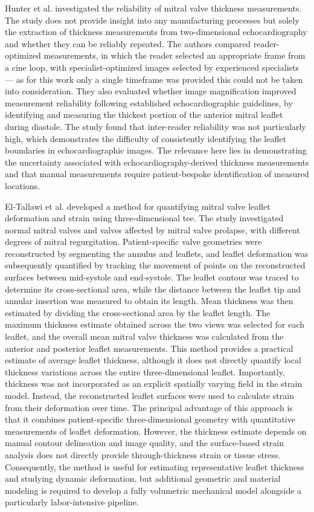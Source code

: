 Hunter et al. \cite{hunter2020screening} investigated the reliability of mitral valve thickness measurements. The study does not provide insight into any manufacturing processes but solely the extraction of thickness measurements from two-dimensional echocardiography and whether they can be reliably repeated. The authors compared reader-optimized measurements, in which the reader selected an appropriate frame from a cine loop, with specialist-optimized images selected by experienced specialists --- as for this work only a single timeframe was provided this could not be taken into consideration. They also evaluated whether image magnification improved measurement reliability following established echocardiographic guidelines, by identifying and measuring the thickest portion of the anterior mitral leaflet during diastole. The study found that inter-reader reliability was not particularly high, which demonstrates the difficulty of consistently identifying the leaflet boundaries in echocardiographic images. The relevance here lies in demonstrating the uncertainty associated with echocardiography-derived thickness measurements and that manual measurements require patient-bespoke identification of measured locations. 

El-Tallawi et al. \cite{el2021valve} developed a method for quantifying mitral valve leaflet deformation and strain using three-dimensional \gls{tee}. The study investigated normal mitral valves and valves affected by mitral valve prolapse, with different degrees of mitral regurgitation. Patient-specific valve geometries were reconstructed by segmenting the annulus and leaflets, and leaflet deformation was subsequently quantified by tracking the movement of points on the reconstructed surfaces between mid-systole and end-systole. The leaflet contour was traced to determine its cross-sectional area, while the distance between the leaflet tip and annular insertion was measured to obtain its length. Mean thickness was then estimated by dividing the cross-sectional area by the leaflet length. The maximum thickness estimate obtained across the two views was selected for each leaflet, and the overall mean mitral valve thickness was calculated from the anterior and posterior leaflet measurements. This method provides a practical estimate of average leaflet thickness, although it does not directly quantify local thickness variations across the entire three-dimensional leaflet. Importantly, thickness was not incorporated as an explicit spatially varying field in the strain model. Instead, the reconstructed leaflet surfaces were used to calculate strain from their deformation over time. The principal advantage of this approach is that it combines patient-specific three-dimensional geometry with quantitative measurements of leaflet deformation. However, the thickness estimate depends on manual contour delineation and image quality, and the surface-based strain analysis does not directly provide through-thickness strain or tissue stress. Consequently, the method is useful for estimating representative leaflet thickness and studying dynamic deformation, but additional geometric and material modeling is required to develop a fully volumetric mechanical model alongside a particularly labor-intensive pipeline.

